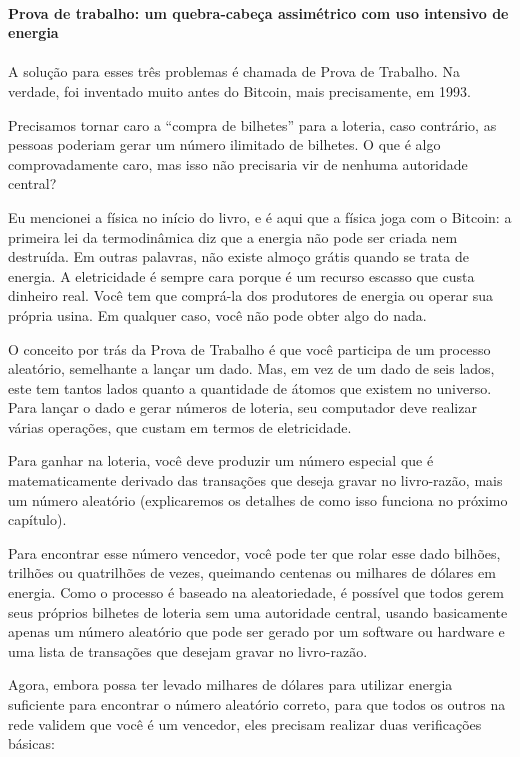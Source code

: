 \paragraph{Prova de trabalho: um quebra-cabeça assimétrico com uso intensivo de energia}
\paragraph{}
A solução para esses três problemas é chamada de Prova de Trabalho. Na verdade, foi inventado muito antes do Bitcoin, mais precisamente, em 1993.

Precisamos tornar caro a “compra de bilhetes” para a loteria, caso contrário, as pessoas poderiam gerar um número ilimitado de bilhetes. O que é algo comprovadamente caro, mas isso não precisaria vir de nenhuma autoridade central?

Eu mencionei a física no início do livro, e é aqui que a física joga com o Bitcoin: a primeira lei da termodinâmica diz que a energia não pode ser criada nem destruída. Em outras palavras, não existe almoço grátis quando se trata de energia. A eletricidade é sempre cara porque é um recurso escasso que custa dinheiro real. Você tem que comprá-la dos produtores de energia ou operar sua própria usina. Em qualquer caso, você não pode obter algo do nada.

O conceito por trás da Prova de Trabalho é que você participa de um processo aleatório, semelhante a lançar um dado. Mas, em vez de um dado de seis lados, este tem tantos lados quanto a quantidade de átomos que existem no universo. Para lançar o dado e gerar números de loteria, seu computador deve realizar várias operações, que custam em termos de eletricidade.

Para ganhar na loteria, você deve produzir um número especial que é matematicamente derivado das transações que deseja gravar no livro-razão, mais um número aleatório (explicaremos os detalhes de como isso funciona no próximo capítulo).

Para encontrar esse número vencedor, você pode ter que rolar esse dado bilhões, trilhões ou quatrilhões de vezes, queimando centenas ou milhares de dólares em energia. Como o processo é baseado na aleatoriedade, é possível que todos gerem seus próprios bilhetes de loteria sem uma autoridade central, usando basicamente apenas um número aleatório que pode ser gerado por um software ou hardware e uma lista de transações que desejam gravar no livro-razão.

Agora, embora possa ter levado milhares de dólares para utilizar energia suficiente para encontrar o número aleatório correto, para que todos os outros na rede validem que você é um vencedor, eles precisam realizar duas verificações básicas:

